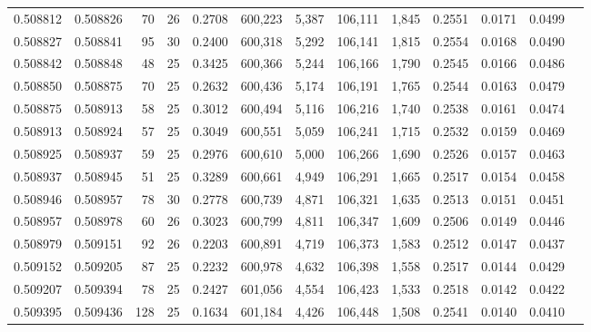 \begin{tabular}{rrrrrrrrrrrrr}
0.508812 & 0.508826 &  70 &  26 &                                     0.2708 & 600,223 &   5,387 & 106,111 &   1,845 & 0.2551 & 0.0171 & 0.0499 \\
0.508827 & 0.508841 &  95 &  30 &                                     0.2400 & 600,318 &   5,292 & 106,141 &   1,815 & 0.2554 & 0.0168 & 0.0490 \\
0.508842 & 0.508848 &  48 &  25 &                                     0.3425 & 600,366 &   5,244 & 106,166 &   1,790 & 0.2545 & 0.0166 & 0.0486 \\
0.508850 & 0.508875 &  70 &  25 &                                     0.2632 & 600,436 &   5,174 & 106,191 &   1,765 & 0.2544 & 0.0163 & 0.0479 \\
0.508875 & 0.508913 &  58 &  25 &                                     0.3012 & 600,494 &   5,116 & 106,216 &   1,740 & 0.2538 & 0.0161 & 0.0474 \\
0.508913 & 0.508924 &  57 &  25 &                                     0.3049 & 600,551 &   5,059 & 106,241 &   1,715 & 0.2532 & 0.0159 & 0.0469 \\
0.508925 & 0.508937 &  59 &  25 &                                     0.2976 & 600,610 &   5,000 & 106,266 &   1,690 & 0.2526 & 0.0157 & 0.0463 \\
0.508937 & 0.508945 &  51 &  25 &                                     0.3289 & 600,661 &   4,949 & 106,291 &   1,665 & 0.2517 & 0.0154 & 0.0458 \\
0.508946 & 0.508957 &  78 &  30 &                                     0.2778 & 600,739 &   4,871 & 106,321 &   1,635 & 0.2513 & 0.0151 & 0.0451 \\
0.508957 & 0.508978 &  60 &  26 &                                     0.3023 & 600,799 &   4,811 & 106,347 &   1,609 & 0.2506 & 0.0149 & 0.0446 \\
0.508979 & 0.509151 &  92 &  26 &                                     0.2203 & 600,891 &   4,719 & 106,373 &   1,583 & 0.2512 & 0.0147 & 0.0437 \\
0.509152 & 0.509205 &  87 &  25 &                                     0.2232 & 600,978 &   4,632 & 106,398 &   1,558 & 0.2517 & 0.0144 & 0.0429 \\
0.509207 & 0.509394 &  78 &  25 &                                     0.2427 & 601,056 &   4,554 & 106,423 &   1,533 & 0.2518 & 0.0142 & 0.0422 \\
0.509395 & 0.509436 & 128 &  25 &                                     0.1634 & 601,184 &   4,426 & 106,448 &   1,508 & 0.2541 & 0.0140 & 0.0410 \\

\end{tabular}
